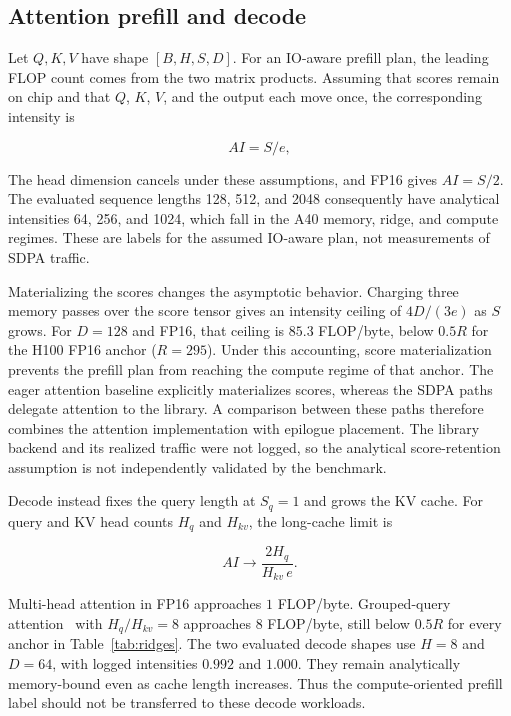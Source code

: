 \documentclass[a4paper,fleqn]{cas-dc}
\begin{document}
\subsection{Attention prefill and decode}
\label{sec:attn-ai}

Let $Q,K,V$ have shape $[B,H,S,D]$.
For an IO-aware prefill plan, the leading FLOP count comes from the two matrix products.
Assuming that scores remain on chip and that $Q$, $K$, $V$, and the output each move once, the corresponding intensity is

\begin{equation}
  AI = S / e,
  \label{eq:fa}
\end{equation}

The head dimension cancels under these assumptions, and FP16 gives $AI{=}S/2$.
The evaluated sequence lengths 128, 512, and 2048 consequently have analytical intensities 64, 256, and 1024, which fall in the A40 memory, ridge, and compute regimes.
These are labels for the assumed IO-aware plan, not measurements of SDPA traffic.

Materializing the scores changes the asymptotic behavior.
Charging three memory passes over the score tensor gives an intensity ceiling of $4D/(3e)$ as $S$ grows.
For $D{=}128$ and FP16, that ceiling is $85.3$ FLOP/byte, below $0.5R$ for the H100 FP16 anchor ($R{=}295$).
Under this accounting, score materialization prevents the prefill plan from reaching the compute regime of that anchor.
The eager attention baseline explicitly materializes scores, whereas the SDPA paths delegate attention to the library.
A comparison between these paths therefore combines the attention implementation with epilogue placement.
The library backend and its realized traffic were not logged, so the analytical score-retention assumption is not independently validated by the benchmark.

Decode instead fixes the query length at $S_q{=}1$ and grows the KV cache.
For query and KV head counts $H_q$ and $H_{kv}$, the long-cache limit is

\begin{equation}
  AI \to \frac{2 H_q}{H_{kv}\, e}.
  \label{eq:decode}
\end{equation}

Multi-head attention in FP16 approaches $1$ FLOP/byte.
Grouped-query attention~\cite{Ainslie2023GQA} with $H_q/H_{kv}{=}8$ approaches $8$ FLOP/byte, still below $0.5R$ for every anchor in Table~\ref{tab:ridges}.
The two evaluated decode shapes use $H{=}8$ and $D{=}64$, with logged intensities $0.992$ and $1.000$.
They remain analytically memory-bound even as cache length increases.
Thus the compute-oriented prefill label should not be transferred to these decode workloads.
\end{document}
